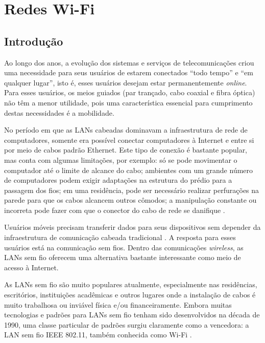 \chapter{Redes Wi-Fi}
\label{cap:redes-wifi}

\section{Introdução}
\label{sec:introducao}

Ao longo dos anos, a evolução  dos sistemas e serviços de telecomunicações criou uma necessidade para seus usuários de estarem conectados ``todo tempo'' e ``em qualquer lugar'', isto é, esses usuários desejam estar permanentemente \textit{online}. Para esses usuários, os meios guiados (par trançado, cabo coaxial e fibra óptica) não têm a menor utilidade, pois uma característica essencial para cumprimento destas necessidades é a mobilidade.

No período em que as LANs cabeadas dominavam a infraestrutura de rede de computadores, somente era possível conectar computadores à Internet e entre si por meio de cabos padrão Ethernet. Este tipo de conexão é bastante popular, mas conta com algumas limitações, por exemplo: só se pode movimentar o computador até o limite de alcance do cabo; ambientes com um grande número de computadores podem exigir adaptações na estrutura do prédio para a passagem dos fios; em uma residência, pode ser necessário realizar perfurações na parede para que os cabos alcancem outros cômodos; a manipulação constante ou incorreta pode fazer com que o conector do cabo de rede se danifique \cite{alecrim2008site}.

Usuários móveis precisam transferir dados para seus dispositivos sem depender da infraestrutura de comunicação cabeada tradicional \cite{tanenbaum2011}. A resposta para esses usuários está na comunicação sem fios. Dentro das comunicações \textit{wireless}, as LANs sem fio oferecem uma alternativa bastante interessante como meio de acesso à Internet.

As LANs sem fio são muito populares atualmente, especialmente nas residências, escritórios, instituições acadêmicas e outros lugares onde a instalação de cabos é muito trabalhosa ou inviável física e/ou financeiramente. Embora muitas tecnologias e padrões para LANs sem fio tenham sido desenvolvidos na década de 1990, uma classe particular de padrões surgiu claramente como a vencedora: a LAN sem fio IEEE 802.11, também conhecida como Wi-Fi \cite{kurose2013}.

